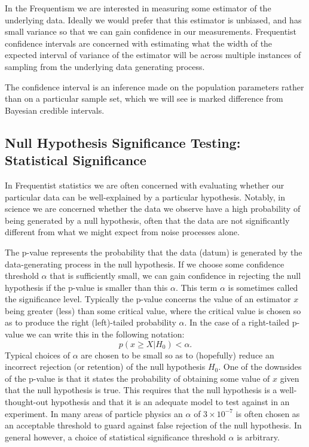 In the Frequentism we are interested in measuring some estimator of the underlying data. Ideally we would prefer that this estimator is unbiased, and has small variance so that we can gain confidence in our measurements. Frequentist confidence intervals are concerned with estimating what the width of the expected interval of variance of the estimator will be across multiple instances of sampling from the underlying data generating process.

The confidence interval is an inference made on the population parameters rather than on a particular sample set, which we will see is marked difference from Bayesian credible intervals.

\subsection{Null Hypothesis Significance Testing: Statistical Significance}
In Frequentist statistics we are often concerned with evaluating whether our particular data can be well-explained by a particular hypothesis. Notably, in science we are concerned whether the data we observe have a high probability of being generated by a null hypothesis, often that the data are not significantly different from what we might expect from noise processes alone.

The p-value represents the probability that the data (datum) is generated by the data-generating process in the null hypothesis. If we choose some confidence threshold  $\alpha$ that is sufficiently small, we can gain confidence in rejecting the null hypothesis if the p-value is smaller than this $\alpha$. This term $\alpha$ is sometimes called the significance level. Typically the p-value concerns the value of an estimator $x$ being greater (less) than some critical value, where the critical value is chosen so as to produce the right (left)-tailed probability $\alpha$. In the case of a right-tailed p-value we can write this in the following notation:
\begin{equation}\label{eqn:p_value}
    p(x \geq X | H_{0}) < \alpha.
\end{equation}
Typical choices of $\alpha$ are chosen to be small so as to (hopefully) reduce an incorrect rejection (or retention) of the null hypothesis $H_0$. One of the downsides of the p-value is that it states the probability of obtaining some value of $x$ given that the null hypothesis is true. This requires that the null hypothesis is a well-thought-out hypothesis and that it is an adequate model to test against in an experiment. In many areas of particle physics an $\alpha$ of $3 \times 10^{-7}$ is often chosen as an acceptable threshold to guard against false rejection of the null hypothesis. In general however, a choice of statistical significance threshold $\alpha$ is arbitrary.

